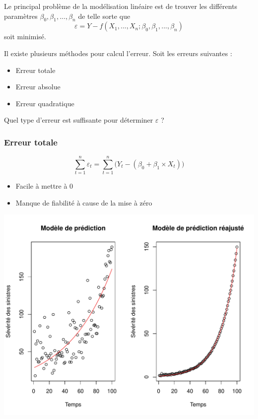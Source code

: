 \documentclass[11pt,french]{report}
\begin{document}
Le principal problème de la modélisation linéaire est de trouver les différents paramètres $\beta_0, \beta_1, ..., \beta_n$ de telle sorte que
\begin{equation}
\varepsilon = Y - f(X_1,...,X_n; \beta_0, \beta_1,...,\beta_n)
\end{equation}
soit minimisé.
\bigskip

Il existe plusieurs méthodes pour calcul l'erreur. Soit les erreurs suivantes :
\begin{itemize}
\item Erreur totale
\item Erreur absolue
\item Erreur quadratique
\end{itemize}
\bigskip

Quel type d'erreur est suffisante pour déterminer $\varepsilon$ ?

\subsubsection{Erreur totale}
\begin{equation}
\displaystyle\sum_{t=1}^n \varepsilon_t = \displaystyle\sum_{t=1}^n \Big( Y_t - (\beta_0 + \beta_1\times X_t) \Big) 
\end{equation}

\bigskip
\begin{itemize}
\item Facile à mettre à 0
\item Manque de fiabilité à cause de la mise à zéro
\end{itemize}

\bigskip
\includegraphics{notes_de_cours-005}
\end{document}
